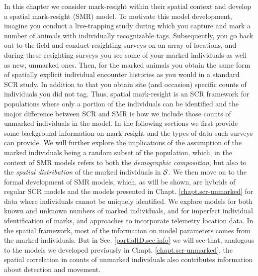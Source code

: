 In this chapter we consider mark-resight within
their %
spatial context and
develop a spatial mark-resight (SMR) model. To motivate this model
development, imagine you conduct a live-trapping study during which
you capture and mark a number of animals with individually
recognizable tags. Subsequently, you go back out to the field and
conduct resighting surveys on an array of locations, and during these
resighting surveys you see some of your marked individuals as well as
new, unmarked ones. Then, for the marked animals you obtain the same
form of spatially explicit individual encounter histories as you would
in a standard SCR study. In addition to that you obtain site (and occasion)
specific counts of individuals you did not tag. Thus, spatial
mark-resight is an SCR framework for populations where only a portion of
the individuals can be identified and the major difference between SCR
and SMR is how we include those counts of unmarked individuals in the
model. In the following sections we first provide some background
information on mark-resight and the types of data such surveys can
provide. We will further explore the implications of the assumption of
the marked individuals being a random subset of the population, which,
in the context of SMR models refers to both the \emph{demographic
  composition}, but also to the \emph{spatial distribution} of the
marked individuals in ${\cal S}$.
We then move on to the formal
development of SMR models,
which, as will be shown, are hybrids of regular SCR models and the
models presented in Chapt. \ref{chapt.scr-unmarked}
for data where individuals cannot be uniquely identified. We explore models for
both known and unknown numbers of marked individuals, and for
imperfect individual identification of marks, and approaches to incorporate 
telemetry location data. In the spatial
framework, most of the information on model parameters comes from the
marked individuals. But in Sec. \ref{partialID.sec.info} we will see
that, analogous to the models we developed previously in
Chapt. \ref{chapt.scr-unmarked}, the spatial correlation in counts of
unmarked individuals also contributes information about detection and
movement.

